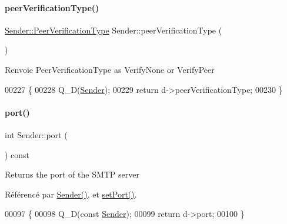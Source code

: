 \paragraph{\texorpdfstring{peer\+Verification\+Type()}{peerVerificationType()}}
{\footnotesize\ttfamily \hyperlink{class_simple_mail_1_1_sender_acfbcf388ab7c26cd41c5c77601fe8804}{Sender\+::\+Peer\+Verification\+Type} Sender\+::peer\+Verification\+Type (\begin{DoxyParamCaption}{ }\end{DoxyParamCaption})}

\begin{DoxyReturn}{Renvoie}
Peer\+Verification\+Type as Verify\+None or Verify\+Peer 
\end{DoxyReturn}

\begin{DoxyCode}
00227 \{
00228     Q\_D(\hyperlink{class_simple_mail_1_1_sender}{Sender});
00229     \textcolor{keywordflow}{return} d->peerVerificationType;
00230 \}
\end{DoxyCode}
\mbox{\label{class_simple_mail_1_1_sender_a9c30e23e4b14333276af1a8b265ccb3c}} 
\paragraph{\texorpdfstring{port()}{port()}}
{\footnotesize\ttfamily int Sender\+::port (\begin{DoxyParamCaption}{ }\end{DoxyParamCaption}) const}

Returns the port of the S\+M\+TP server 

Référencé par \hyperlink{class_simple_mail_1_1_sender_a120ee6620d9f22b5c008b27743d03a6d}{Sender()}, et \hyperlink{class_simple_mail_1_1_sender_a42eacd78ed9bef0f77215bce72cafe2d}{set\+Port()}.


\begin{DoxyCode}
00097 \{
00098     Q\_D(\textcolor{keyword}{const} \hyperlink{class_simple_mail_1_1_sender}{Sender});
00099     \textcolor{keywordflow}{return} d->port;
00100 \}
\end{DoxyCode}
\mbox{\label{class_simple_mail_1_1_sender_a9e60ec56a562bc41a58688a4566f6ff1}} 
